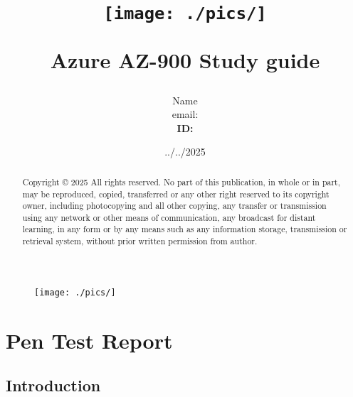 \documentclass[11pt, a4paper]{article}
\begin{document}
\pagestyle{fancy}

\title{
    \begin{figure}[h]
        \centering
        \texttt{[image: ./pics/]}
    \end{figure}    
Azure AZ-900 Study guide}
\author{Name \\ email: \href{mailto:}{} \\ \textbf{ID: }}
\date{../../2025}
\renewcommand*\contentsname{Table of Contents}
\maketitle

\renewcommand*\abstractname{Copyright}

\begin{abstract}
Copyright © 2025 All rights reserved.
No part of this publication, in whole or in part, may be reproduced, copied, transferred or any other right reserved to its copyright owner, including photocopying and all other copying, any transfer or transmission using any network or other means of communication, any broadcast for distant learning, in any form or by any means such as any information storage, transmission or retrieval system, without prior written permission from author.
\end{abstract}

\begin{figure}[h]
    \centering
    \texttt{[image: ./pics/]}
\end{figure}

\newpage

\tableofcontents

\newpage

\fancyhead{} %
\fancyfoot{} %
\fancyfoot[R]{\thepage}


\section{Pen Test Report}

\subsection{Introduction}
\end{document}
